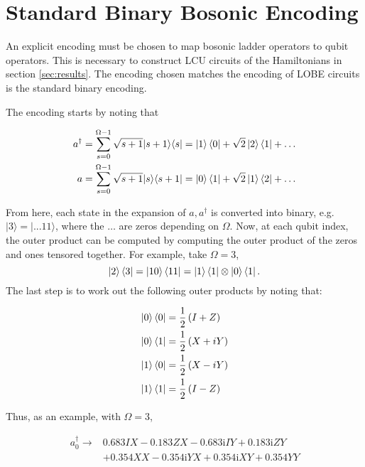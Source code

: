 \section{Standard Binary Bosonic Encoding}
\label{sec:SB}

An explicit encoding must be chosen to map bosonic ladder operators to qubit operators.
This is necessary to construct LCU circuits of the Hamiltonians in section \ref{sec:results}.
The encoding chosen matches the encoding of LOBE circuits is the standard binary \cite{standard-binary} encoding.

The encoding starts by noting that 

\begin{align}
    a^\dagger &= \sum_{s = 0}^{\Omega - 1}\sqrt{s + 1}|s + 1\rangle \langle s| = \ket{1}\bra{0} + \sqrt{2}\ket{2}\bra{1} + \dots\\
    a &= \sum_{s = 0}^{\Omega - 1}\sqrt{s + 1}|s\rangle \langle s + 1| = \ket{0}\bra{1} + \sqrt{2}\ket{1}\bra{2} + \dots\\
\end{align}

From here, each state in the expansion of $a, a^\dagger$ is converted into binary, e.g. $|3\rangle = |...11\rangle$, where the $\dots$ are zeros depending on $\Omega$.
Now, at each qubit index, the outer product can be computed by computing the outer product of the zeros and ones tensored together.
For example, take $\Omega = 3$,$$
\ket{2}\bra{3} = \ket{10}\bra{11} = \ket{1}\bra{1} \otimes \ket{0}\bra{1}.
$$
The last step is to work out the following outer products by noting that:

\begin{align}
    \ket{0}\bra{0} &= \frac12 \left(I + Z \right)\\
    \ket{0}\bra{1} &= \frac12 \left(X + iY \right)\\
    \ket{1}\bra{0} &= \frac12 \left(X - iY \right)\\
    \ket{1}\bra{1} &= \frac12 \left(I - Z \right)\\ 
\end{align}

Thus, as an example, with $\Omega = 3$, 

\begin{align}
    a_0^\dagger \rightarrow &0.683IX -0.183 ZX - 0.683\mathrm{i} IY + 0.183\mathrm{i} ZY \\
    & +0.354 XX - 0.354\mathrm{i} YX + 0.354\mathrm{i} XY + 0.354 YY
\end{align}